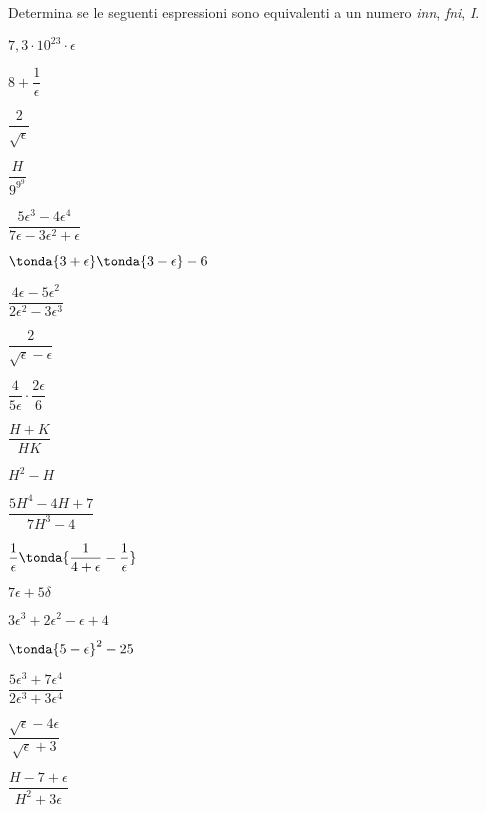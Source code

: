 \begin{esercizio}\label{ese:iper_op_01}
Determina se le seguenti espressioni sono equivalenti a un numero 
\emph{inn}, \emph{fni}, \emph{I}.
\begin{multicols}{3}
\begin{enumeratea}
 \item \(7,3 \cdot 10^{23} \cdot \epsilon\)
 \item \(8 +\dfrac{1}{\epsilon}\)
 \item \(\dfrac{2}{\sqrt{\epsilon}}\) 
 \item \(\dfrac{H}{9^{9^9}}\) 
 \item \(\dfrac{5 \epsilon^3 -4 \epsilon^4}
               {7 \epsilon -3 \epsilon^2 +\epsilon}\)
 \item \(\tonda{3 +\epsilon} \tonda{3 -\epsilon} -6\) 
 \item \(\dfrac{4 \epsilon - 5 \epsilon^2}{2 \epsilon^2 -3 \epsilon^3}\) 
 \item \(\dfrac{2}{\sqrt{\epsilon} - \epsilon}\) 
 \item \(\dfrac{4}{5 \epsilon} \cdot \dfrac{2 \epsilon}{6}\) 
 \item \(\dfrac{H + K}{HK}\) 
 \item \(H^2 - H\)  
 \item \(\dfrac{5 H^4 -4 H +7} {7 H^3 -4}\)
 \item \(\dfrac{1}{\epsilon} \tonda{\dfrac{1} {4 + \epsilon} -
                                    \dfrac{1}{\epsilon}}\)
 \item \(7 \epsilon + 5 \delta\)
 \item \(3 \epsilon^3 +2 \epsilon^2 - \epsilon +4\)
 \item \(\tonda{5 - \epsilon}^2 - 25\)
 \item \(\dfrac{5 \epsilon^3 + 7  \epsilon^4}{2 \epsilon^3 + 3  
\epsilon^4}\)
 \item \(\dfrac{\sqrt{\epsilon} -4 \epsilon}{\sqrt{\epsilon} + 3}\)
 \item \(\dfrac{H -7 +\epsilon}{H^2 + 3 \epsilon}\)
\end{enumeratea}
\end{multicols}
\end{esercizio}

\subsubsection*{}

